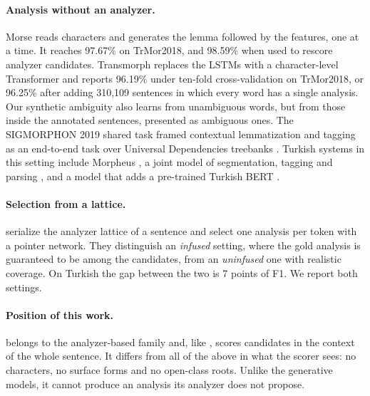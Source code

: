 \paragraph{Analysis without an analyzer.}
Morse \citep{akyurek-etal-2019-morphological} reads characters and generates the lemma followed by the features, one at a time. It reaches 97.67\% on TrMor2018, and 98.59\% when used to rescore analyzer candidates. Transmorph \citep{ozer-korkmaz-2022-transmorph} replaces the LSTMs with a character-level Transformer and reports 96.19\% under ten-fold cross-validation on TrMor2018, or 96.25\% after adding 310,109 sentences in which every word has a single analysis. Our synthetic ambiguity also learns from unambiguous words, but from those inside the annotated sentences, presented as ambiguous ones. The SIGMORPHON 2019 shared task framed contextual lemmatization and tagging as an end-to-end task over Universal Dependencies treebanks \citep{mccarthy-etal-2019-sigmorphon}. Turkish systems in this setting include Morpheus \citep{yildiz-tantug-2019-morpheus}, a joint model of segmentation, tagging and parsing \citep{can-etal-2022-joint}, and a model that adds a pre-trained Turkish BERT \citep{sayallar-2025-context}.

\paragraph{Selection from a lattice.}
\citet{seker-tsarfaty-2020-pointer} serialize the analyzer lattice of a sentence and select one analysis per token with a pointer network. They distinguish an \emph{infused} setting, where the gold analysis is guaranteed to be among the candidates, from an \emph{uninfused} one with realistic coverage. On Turkish the gap between the two is 7 points of F1. We report both settings.

\paragraph{Position of this work.}
\savyar{} belongs to the analyzer-based family and, like \citet{seker-tsarfaty-2020-pointer}, scores candidates in the context of the whole sentence. It differs from all of the above in what the scorer sees: no characters, no surface forms and no open-class roots. Unlike the generative models, it cannot produce an analysis its analyzer does not propose.
